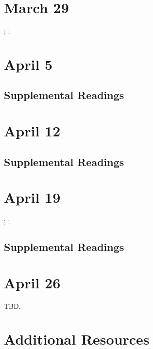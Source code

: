 \documentclass[11pt]{article}
\begin{document}

\section{March 29}
\label{sec:org1da3ff8}

; ; 

\section{April 5}
\label{sec:orgd1dc93e}


\subsection{Supplemental Readings}
\label{sec:org432a777}

\cite{Burrill2008}

\section{April 12}
\label{sec:org2a6f35d}


\subsection{Supplemental Readings}
\label{sec:org1826514}

\cite{Shaw:2015dr}

\section{April 19}
\label{sec:org602788f}

; ; 

\subsection{Supplemental Readings}
\label{sec:org8d0eeac}

\cite{Ruberg:2017ww}

\section{April 26}
\label{sec:orgad8844b}

TBD.

\section{Additional Resources}
\label{sec:org68197f2}


\nocite{*} 
\printbibliography
\end{document}

